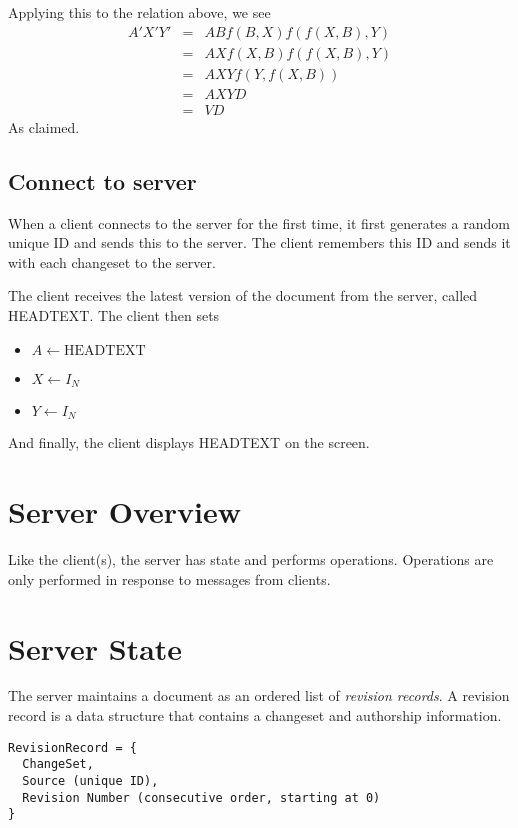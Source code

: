 \documentclass{article}
\begin{document}
Applying this to the relation above, we see
\begin{eqnarray*}
A'X'Y'&=& AB f(B,X) f(f(X,B),Y) \\
      &=&AX f(X,B) f(f(X,B),Y) \\
      &=&A X Y f(Y, f(X,B)) \\
      &=&A X Y D \\
      &=&V D
\end{eqnarray*}
As claimed.

\subsection{Connect to server}

When a client connects to the server for the first time,
it first generates a random unique ID and sends this to
the server.  The client remembers this ID and sends it
with each changeset to the server.

The client receives the latest version of the document
from the server, called HEADTEXT.  The client then sets

\begin{itemize}
\item[] $A \leftarrow \mathrm{HEADTEXT}$
\item[] $X \leftarrow I_N$
\item[] $Y \leftarrow I_N$
\end{itemize}

And finally, the client displays HEADTEXT on the screen.

\section{Server Overview}

Like the client(s), the server has state and performs
operations.  Operations are only performed in response to
messages from clients.

\section{Server State}

The server maintains a document as an ordered list of
\emph{revision records}.  A revision record is a data
structure that contains a changeset and authorship
information.

\begin{verbatim}
RevisionRecord = {
  ChangeSet,
  Source (unique ID),
  Revision Number (consecutive order, starting at 0)
}
\end{verbatim}
\end{document}
